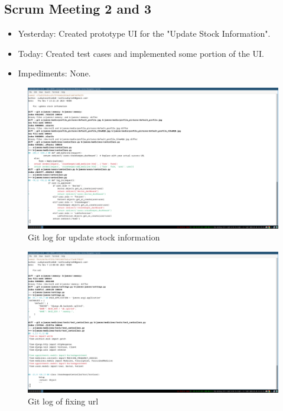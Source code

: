 \documentclass[a4paper,12pt]{article}
\begin{document}
\subsection{Scrum Meeting 2 and 3}
\begin{itemize}
    \item Yesterday: Created prototype UI for the "Update Stock Information".
    \item Today: Created test cases and implemented some portion of the UI.
    \item Impediments: None.
\end{itemize}
\begin{figure}[H]
    \centering
    \includegraphics[width=1\textwidth]{images/meet21.png}   
    \caption{Git log for update stock information}
    \label{fig:meet21}
\end{figure}
\begin{figure}[H]
    \centering
    \includegraphics[width=1\textwidth]{images/meet22.png}   
    \caption{Git log of fixing url}
    \label{fig:meet22}
\end{figure}
\end{document}
